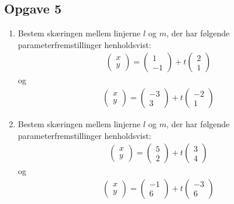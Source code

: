 \subsection*{Opgave 5}
\begin{enumerate}[label=\roman*)]

\item Bestem skæringen mellem linjerne $l$ og $m$, der har følgende parameterfremstillinger henholdsvist:
\begin{align*}
\begin{pmatrix}
x \\ y
\end{pmatrix}
= 
\begin{pmatrix}
1 \\ -1
\end{pmatrix}
+
t
\begin{pmatrix}
2 \\ 1
\end{pmatrix}
\end{align*}
og 
\begin{align*}
\begin{pmatrix}
x \\ y
\end{pmatrix}
= 
\begin{pmatrix}
-3 \\ 3
\end{pmatrix}
+
t
\begin{pmatrix}
-2 \\ 1
\end{pmatrix}
\end{align*}

\item Bestem skæringen mellem linjerne $l$ og $m$, der har følgende parameterfremstillinger henholdsvist:
\begin{align*}
\begin{pmatrix}
x \\ y
\end{pmatrix}
= 
\begin{pmatrix}
5 \\ 2
\end{pmatrix}
+
t
\begin{pmatrix}
3 \\ 4
\end{pmatrix}
\end{align*}
og 
\begin{align*}
\begin{pmatrix}
x \\ y
\end{pmatrix}
= 
\begin{pmatrix}
-1 \\ 6
\end{pmatrix}
+
t
\begin{pmatrix}
-3 \\ 6
\end{pmatrix}
\end{align*}


\end{enumerate}
